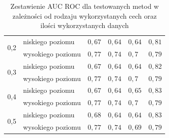 \begin{table}[]
\begin{tabular}{|l|l|l|l|l|l|}
\multirow{2}{*}{0,2}   & niskiego poziomu  &  $ 0,67 $ & $ 0,64 $ & $ 0,64 $ &$ 0,81 $ \\ \cline{2-6} 
                       & wysokiego poziomu &  $ 0,77 $ & $ 0,74 $ & $ 0,7 $ &$ 0,79 $ \\ \hline
                       
\multirow{2}{*}{0,3}   & niskiego poziomu  &  $ 0,67 $ & $ 0,64 $ & $ 0,64 $ &$ 0,82 $ \\ \cline{2-6} 
                       & wysokiego poziomu &  $ 0,77 $ & $ 0,74 $ & $ 0,7 $ &$ 0,79 $ \\ \hline
                       
\multirow{2}{*}{0,4}   & niskiego poziomu  & $ 0,67 $ & $ 0,64 $ & $ 0,65 $ &$ 0,83 $ \\ \cline{2-6} 
                       & wysokiego poziomu &  $ 0,77 $ & $ 0,74 $ & $ 0,7 $ &$ 0,79 $ \\ \hline
                       
\multirow{2}{*}{0,5}   & niskiego poziomu  &  $ 0,68 $ & $ 0,64 $ & $ 0,64 $ &$ 0,83 $ \\ \cline{2-6} 
                       & wysokiego poziomu &  $ 0,77 $ & $ 0,74 $ & $ 0,69 $ &$ 0,79 $ \\ \hline
\end{tabular}

\caption{Zestawienie AUC ROC dla testowanych metod w zależności od rodzaju wykorzystanych cech oraz ilości wykorzystanych danych}
\label{table:higgstable}

\end{table}


